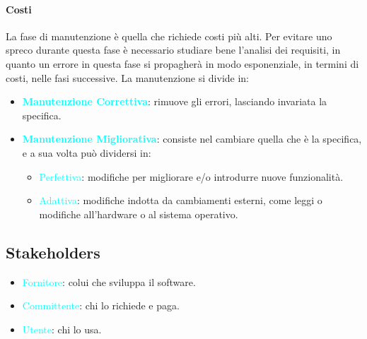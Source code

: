 \documentclass{article}
\begin{document}
\begin{sloppypar}
        \paragraph{Costi} 
        La fase di manutenzione è quella che richiede costi più alti. 
        Per evitare uno spreco durante questa fase è necessario studiare bene l'analisi dei requisiti, in quanto un errore in questa fase
        si propagherà in modo esponenziale, in termini di costi, nelle fasi successive.
        \break
        \break
        La manutenzione si divide in:
        \begin{itemize}
            \item \textbf{\textcolor{cyan}{Manutenzione Correttiva}}: rimuove gli errori, lasciando invariata la specifica.
            \item \textbf{\textcolor{cyan}{Manutenzione Migliorativa}}: consiste nel cambiare quella che è la specifica, e a sua volta può dividersi in:
                \begin{itemize}
                    \item \textcolor{cyan}{Perfettiva}: modifiche per migliorare e/o introdurre nuove funzionalità.
                    \item \textcolor{cyan}{Adattiva}: modifiche indotta da cambiamenti esterni, come leggi o modifiche all'hardware o al sistema operativo.
                \end{itemize}
        \end{itemize}
        \subsection*{Stakeholders}
            \begin{itemize}
                \item \textcolor{cyan}{Fornitore}: colui che sviluppa il software.
                \item \textcolor{cyan}{Committente}: chi lo richiede e paga.
                \item \textcolor{cyan}{Utente}: chi lo usa.
            \end{itemize}
    \end{sloppypar}
\end{document}
